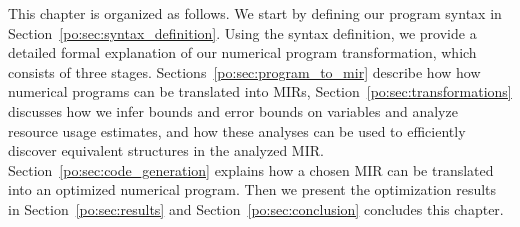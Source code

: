 This chapter is organized as follows.  We start by defining our program syntax
in Section~\ref{po:sec:syntax_definition}.  Using the syntax definition, we
provide a detailed formal explanation of our numerical program transformation,
which consists of three stages.  Sections~\ref{po:sec:program_to_mir}
describe how how numerical programs can be translated into MIRs,
Section~\ref{po:sec:transformations} discusses how we infer bounds and
error bounds on variables and analyze resource usage estimates, and how
these analyses can be used to efficiently discover equivalent structures
in the analyzed MIR\@.  Section~\ref{po:sec:code_generation} explains how
a chosen MIR can be translated into an optimized numerical program.  Then
we present the optimization results in Section~\ref{po:sec:results} and
Section~\ref{po:sec:conclusion} concludes this chapter.
